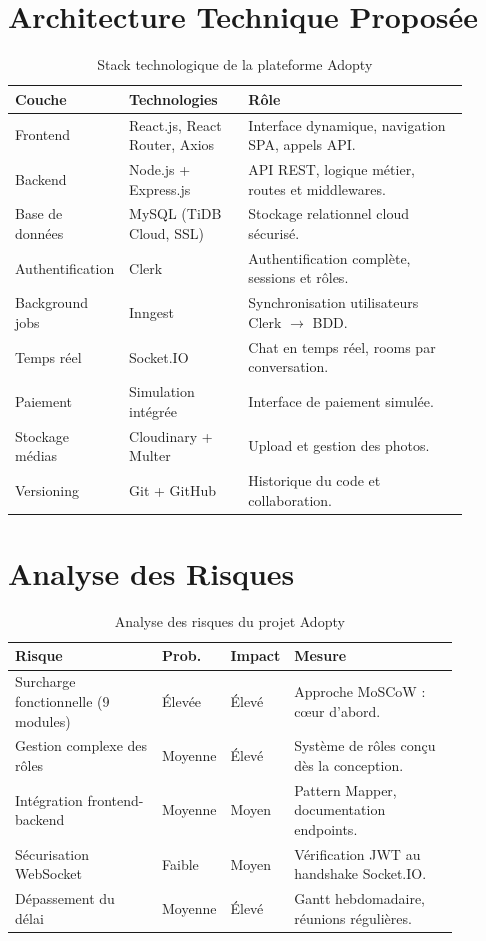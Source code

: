 \documentclass[12pt,a4paper]{report}
\begin{document}
\section{Architecture Technique Proposée}

\begin{table}[H]
\centering
\begin{tabular}{@{}L{0.16\linewidth}L{0.26\linewidth}L{0.48\linewidth}@{}}
\toprule
\textbf{Couche} & \textbf{Technologies} & \textbf{Rôle} \\
\midrule
Frontend & React.js, React Router, Axios & Interface dynamique, navigation SPA, appels API. \\[3pt]
Backend & Node.js + Express.js & API REST, logique métier, routes et middlewares. \\[3pt]
Base de données & MySQL (TiDB Cloud, SSL) & Stockage relationnel cloud sécurisé. \\[3pt]
Authentification & Clerk & Authentification complète, sessions et rôles. \\[3pt]
Background jobs & Inngest & Synchronisation utilisateurs Clerk $\rightarrow$ BDD. \\[3pt]
Temps réel & Socket.IO & Chat en temps réel, rooms par conversation. \\[3pt]
Paiement & Simulation intégrée & Interface de paiement simulée. \\[3pt]
Stockage médias & Cloudinary + Multer & Upload et gestion des photos. \\[3pt]
Versioning & Git + GitHub & Historique du code et collaboration. \\
\bottomrule
\end{tabular}
\caption{Stack technologique de la plateforme Adopty}
\label{tab:stack-cdc}
\end{table}

\section{Analyse des Risques}

\begin{table}[H]
\centering
\begin{tabular}{@{}L{0.34\linewidth}L{0.08\linewidth}L{0.08\linewidth}L{0.38\linewidth}@{}}
\toprule
\textbf{Risque} & \textbf{Prob.} & \textbf{Impact} & \textbf{Mesure} \\
\midrule
Surcharge fonctionnelle (9 modules) & Élevée & Élevé & Approche MoSCoW : cœur d'abord. \\[3pt]
Gestion complexe des rôles & Moyenne & Élevé & Système de rôles conçu dès la conception. \\[3pt]
Intégration frontend-backend & Moyenne & Moyen & Pattern Mapper, documentation endpoints. \\[3pt]
Sécurisation WebSocket & Faible & Moyen & Vérification JWT au handshake Socket.IO. \\[3pt]
Dépassement du délai & Moyenne & Élevé & Gantt hebdomadaire, réunions régulières. \\
\bottomrule
\end{tabular}
\caption{Analyse des risques du projet Adopty}
\label{tab:risques}
\end{table}
\end{document}
